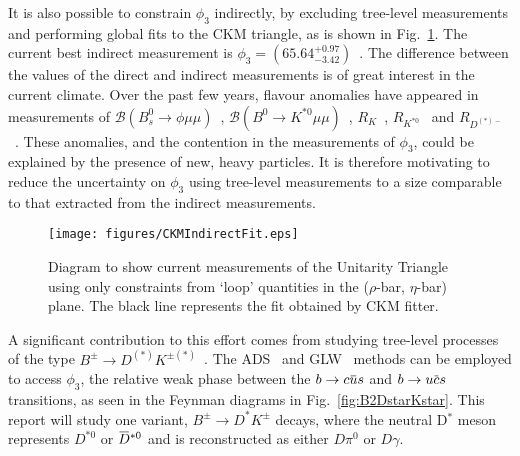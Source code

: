 \documentclass[oneside,12pt]{article}
\newcommand{\overbar}[1]{\mkern 1.5mu\overline{\mkern-1.5mu#1\mkern-1.5mu}\mkern
1.5mu}
\begin{document}
It is also possible to constrain $\phi_3$ indirectly, by excluding tree-level
measurements and performing global fits to the CKM triangle, as is shown in
Fig.~\ref{fig:CKMIndirectFit}. The current best indirect measurement is
$\phi_3=(65.64^{+0.97}_{-3.42})$\degree~\cite{website:CKMFitter}. The
difference between the values of the direct and indirect measurements is of
great interest in the current climate. Over the past few years, flavour
anomalies have appeared in measurements of $\mathcal{B} (B^{0}_{s}\rightarrow
\phi \mu \mu)$~\cite{B2phimumu}, $\mathcal{B} (B^{0}\rightarrow K^{*0} \mu
\mu)$~\cite{B2Kstmumu}, $R_{K}$~\cite{Rk}, $R_{K^{*0}}$~\cite{Rkst} and
$R_{D^{(*)-}}$~\cite{RDst}. These anomalies, and the
contention in the measurements of $\phi_3$, could be explained by the presence
of new, heavy particles. It is therefore motivating to reduce the uncertainty
on $\phi_{3}$ using tree-level measurements to a size comparable to that
extracted from the indirect measurements.
\begin{figure}[htp]
\vspace*{-4mm}
	\centering \texttt{[image: figures/CKMIndirectFit.eps]}
\caption{{Diagram to show current measurements of the Unitarity Triangle
using only constraints from `loop' quantities in the ($\rho$-bar, $\eta$-bar)
plane. The black line represents the fit obtained by CKM fitter.}}
\label{fig:CKMIndirectFit} \vspace{-10pt}
\end{figure}
A significant contribution to this effort comes from studying tree-level
processes of the type $B^{\pm}\rightarrow D^{(*)}K^{\pm (*)}$~\cite{B2DKD2hh,
DalitzRun1, DalitzRun2, B2DKstD2hh, B2DstKD2hh}. The ADS~\cite{ADSRef} and
GLW~\cite{GLWRef} methods can be employed to access $\phi_3$, the relative weak
phase between the $b\rightarrow c\overbar{u}s$ and $b\rightarrow u\overbar{c}s$
transitions, as seen in the Feynman diagrams in Fig.~\ref{fig:B2DstarKstar}.
This report will study one variant, $B^{\pm}\rightarrow D^{*}K^{\pm}$ decays,
where the neutral D$^{*}$ meson represents $D^{*0}$ or $\overbar{D}^{*0}$ and
is reconstructed as either $D\pi^{0}$ or $D\gamma$. 
\end{document}

